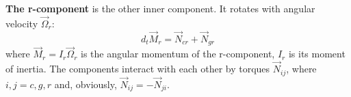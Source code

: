 \documentclass[a4paper]{jpconf}
\newcommand{\eO}{\vec{e}_{\Omega}}
\begin{document}
    \textbf{The r-component} is the other inner component. It rotates with angular velocity $\vec{\Omega}_{r}$:
    \begin{equation}
      \label{eq:dt_Mr}
      d_t\vec{M}_{r}  =  \vec{N}_{cr} + \vec{N}_{gr}
    \end{equation}
    where $\vec{M}_{r}= I_{r} \vec{\Omega}_{r}$ is the angular momentum of the r-component, $I_{r}$ is its moment of inertia.
    The components interact with each other by torques $\vec{N}_{ij}$, where $i,j = c,g,r$ and, obviously, $\vec{N}_{ij}=-\vec{N}_{ji}$.


    
\end{document}
